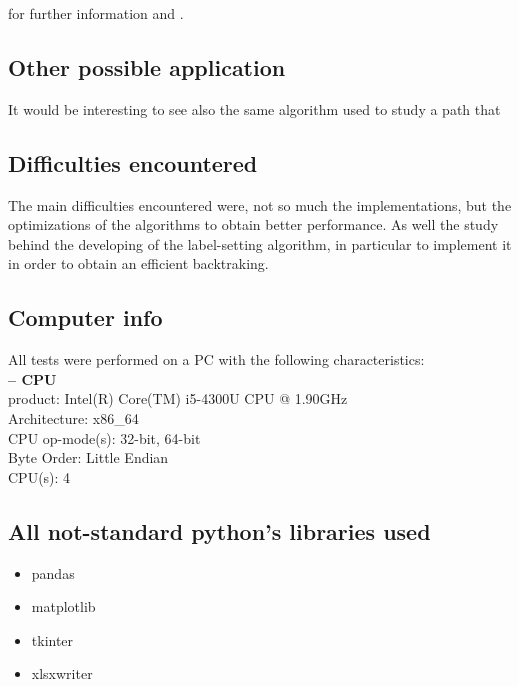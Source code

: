 \documentclass[a4paper,11pt]{report}
\begin{document}
for further information \cite{GAWikipedia} and \cite{GAArticle}. 

\subsection{Other possible application}
It would be interesting to see also the same algorithm used to study a path that 


\subsection{Difficulties encountered}
The main difficulties encountered were, not so much the implementations, but the optimizations of the algorithms to obtain better performance. As well the study behind the developing of the label-setting algorithm, in particular to implement it in order to obtain an efficient backtraking. 

\subsection*{Computer info}
All tests were performed on a PC with the following characteristics:\\
\textbf{-- CPU\\}
product:\hspace{17mm}        Intel(R) Core(TM) i5-4300U CPU @ 1.90GHz\\
Architecture:\hspace{9mm}   x86\_64\\
CPU op-mode(s):\hspace{2mm}  32-bit, 64-bit\\
Byte Order:\hspace{11mm}     Little Endian\\
CPU(s):\hspace{18mm}         4\\

\subsection*{All not-standard python's libraries used}
\begin{itemize}
	\item pandas
	\item matplotlib
	\item tkinter
	\item xlsxwriter
\end{itemize}





\end{document}

